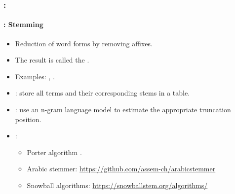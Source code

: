 \documentclass[xcolor=table]{beamer}
\begin{document}
\begin{frame}
	\frametitle{\insertshortsubtitle: \insertsection}
	\framesubtitle{\insertsubsection: Stemming}
	
	\begin{itemize}
		\item Reduction of word forms by removing affixes.
		\item The result is called the .
		\item Examples: , .
		\item {}: store all terms and their corresponding stems in a table.
		\item {}: use an n-gram language model to estimate the appropriate truncation position.
		\item {}:
		\begin{itemize}
			\item Porter algorithm \cite{1980-porter}.
			\item Arabic stemmer: \url{https://github.com/assem-ch/arabicstemmer}
			\item Snowball algorithms: \url{https://snowballstem.org/algorithms/}
		\end{itemize}
	\end{itemize}

\end{frame}
\end{document}
